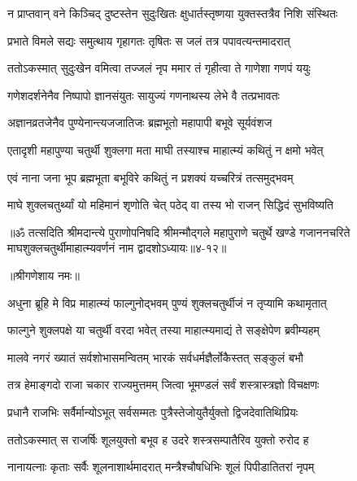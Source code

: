 \twolineshloka
{न प्राप्तवान् वने किञ्चिद् दुष्टस्तेन सुदुःखितः}
{क्षुधार्तस्तृष्णया युक्तस्तत्रैव निशि संस्थितः} %

\twolineshloka
{प्रभाते विमले सद्यः समुत्थाय गृहागतः}
{तृषितः स जलं तत्र पपावत्यन्तमादरात्} %

\twolineshloka
{ततोऽकस्मात् सुदुःखेन वमित्वा तज्जलं नृप}
{ममार तं गृहीत्वा ते गाणेशा गणपं ययुः} %

\twolineshloka
{गणेशदर्शनेनैव निष्पापो ज्ञानसंयुतः}
{सायुज्यं गणनाथस्य लेभे वै तत्प्रभावतः} %

\twolineshloka
{अज्ञानव्रतजेनैव पुण्येनान्त्यजजातिजः}
{ब्रह्मभूतो महापापी बभूवे सूर्यवंशज} %

\twolineshloka
{एतादृशी महापुण्या चतुर्थी शुक्लगा मता}
{माघी तस्याश्च माहात्म्यं कथितुं न क्षमो भवेत्} %

\twolineshloka
{एवं नाना जना भूप ब्रह्मभूता बभूविरे}
{कथितुं न प्रशक्यं यच्चरित्रं तत्समुद्भवम्} %

\twolineshloka
{माघे शुक्लचतुर्थ्यां यो महिमानं श‍ृणोति चेत्}
{पठेद् वा तस्य भो राजन् सिद्धिदं सुभविष्यति} %

॥ॐ तत्सदिति श्रीमदान्त्ये पुराणोपनिषदि श्रीमन्मौद्गले महापुराणे चतुर्थे खण्डे गजाननचरिते माघशुक्लचतुर्थीमाहात्म्यवर्णनं नाम द्वादशोऽध्यायः॥४-१२॥


\label{sec:phalguna-shukla-chaturthi-mahatmya-varnanam}

\centerline{॥श्रीगणेशाय नमः॥}


\twolineshloka
{अधुना ब्रूहि मे विप्र माहात्म्यं फाल्गुनोद्भवम्}
{पुण्यं शुक्लचतुर्थीजं न तृप्यामि कथामृतात्} %


\twolineshloka
{फाल्गुने शुक्लपक्षे या चतुर्थी वरदा भवेत्}
{तस्या माहात्म्यमाद्यं ते सङ्क्षेपेण ब्रवीम्यहम्} %

\twolineshloka
{मालवे नगरं ख्यातं सर्वशोभासमन्वितम्}
{भारकं सर्वधर्मज्ञैर्लोकैस्तत् सङ्कुलं बभौ} %

\twolineshloka
{तत्र हेमाङ्गदो राजा चकार राज्यमुत्तमम्}
{जित्वा भूमण्डलं सर्वं शस्त्रास्त्रज्ञो विचक्षणः} %

\twolineshloka
{प्रधानै राजभिः सर्वैर्मान्योऽभूत् सर्वसम्मतः}
{पुत्रैस्तेजोयुतैर्युक्तो द्विजदेवातिथिप्रियः} %

\twolineshloka
{ततोऽकस्मात् स राजर्षिः शूलयुक्तो बभूव ह}
{उदरे शस्त्रसम्पातैरिव युक्तो रुरोद ह} %

\twolineshloka
{नानायत्नाः कृताः सर्वैः शूलनाशार्थमादरात्}
{मन्त्रैश्चौषधिभिः शूलं पिपीडातितरां नृपम्} %

